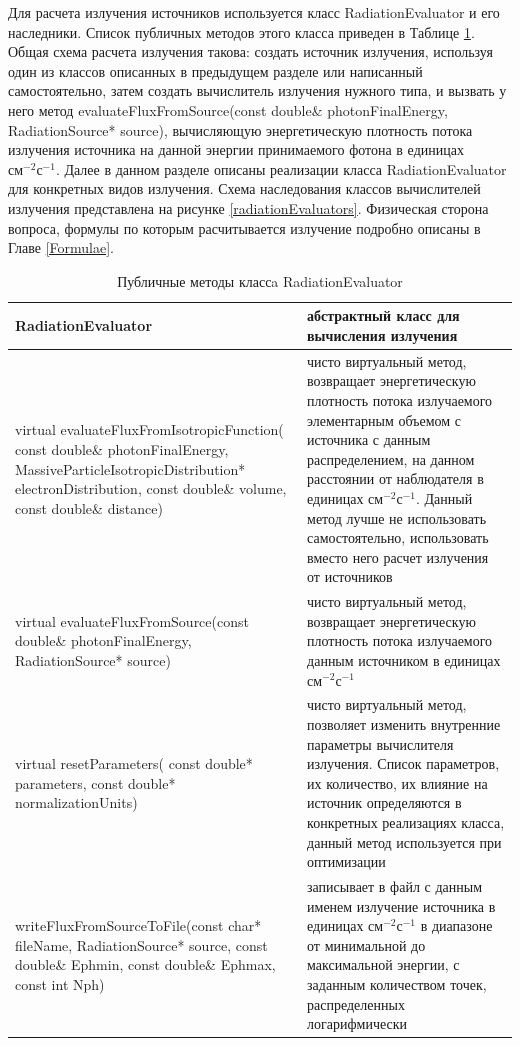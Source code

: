 Для расчета излучения источников используется класс RadiationEvaluator и его наследники. Список публичных методов этого класса приведен в Таблице \ref{radiationEvaluator}. Общая схема расчета излучения такова: создать источник излучения, используя один из классов описанных в предыдущем разделе или написанный самостоятельно, затем создать вычислитель излучения нужного типа, и вызвать у него метод evaluateFluxFromSource(const double\& photonFinalEnergy, RadiationSource* source), вычисляющую энергетическую плотность потока излучения источника на данной энергии принимаемого фотона в единицах  $\text{см}^{-2} \text{с}^{-1}$. Далее в данном разделе описаны реализации класса RadiationEvaluator для конкретных видов излучения. Схема наследования классов вычислителей излучения представлена на рисунке \ref{radiationEvaluators}. Физическая сторона вопроса, формулы по которым расчитывается излучение подробно описаны в Главе \ref{Formulae}.

\begin{table}
	\begin{center}
		\begin{small}
	\caption{Публичные методы классa RadiationEvaluator }
	\label{radiationEvaluator}
	\begin{xtabular}{|p{0.5\textwidth}|p{0.5\textwidth}|} 
		\hline
		\textbf{RadiationEvaluator} & абстрактный класс для вычисления излучения \\
		\hline
		virtual evaluateFluxFromIsotropicFunction( const double\& photonFinalEnergy, MassiveParticleIsotropicDistribution* electronDistribution, const double\& volume, const double\& distance) & чисто виртуальный метод, возвращает энергетическую плотность потока излучаемого элементарным объемом с источника с данным распределением, на данном расстоянии от наблюдателя в единицах $\text{см}^{-2} \text{с}^{-1}$. Данный метод лучше не использовать самостоятельно, использовать вместо него расчет излучения от источников\\
		\hline
		virtual evaluateFluxFromSource(const double\& photonFinalEnergy, RadiationSource* source) & чисто виртуальный метод, возвращает энергетическую плотность потока излучаемого данным источником в единицах $\text{см}^{-2} \text{с}^{-1}$ \\
		\hline
		virtual resetParameters( const double* parameters, const double* normalizationUnits) & чисто виртуальный метод, позволяет изменить внутренние параметры вычислителя излучения. Список параметров, их количество, их влияние на источник определяются  в конкретных реализациях класса, данный метод используется при оптимизации\\
		\hline
		writeFluxFromSourceToFile(const char* fileName, RadiationSource* source, const double\& Ephmin, const double\& Ephmax, const int Nph) & записывает в файл с данным именем излучение источника в единицах $\text{см}^{-2} \text{с}^{-1}$ в диапазоне от минимальной до максимальной энергии, с заданным количеством точек, распределенных логарифмически\\
		\hline
	\end{xtabular}
\end{small}
\end{center}
\end{table}


